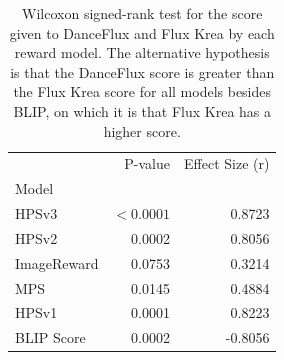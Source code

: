 \begin{table}[]
    \centering
\begin{tabular}{lrr}
\toprule
 & P-value & Effect Size (r) \\
Model &  &  \\
\midrule
HPSv3 & $<0.0001$ & 0.8723 \\
HPSv2 & 0.0002 & 0.8056 \\
ImageReward & 0.0753 & 0.3214 \\
MPS & 0.0145 & 0.4884 \\
HPSv1 & 0.0001 & 0.8223 \\
BLIP Score & 0.0002 & -0.8056 \\
\bottomrule
\end{tabular} 

    \caption{Wilcoxon signed-rank test for the score given to DanceFlux and Flux Krea by each reward model. The alternative hypothesis is that the DanceFlux score is greater than the Flux Krea score for all models besides BLIP, on which it is that Flux Krea has a higher score.} 
    \label{tab:critical_test}
\end{table}






